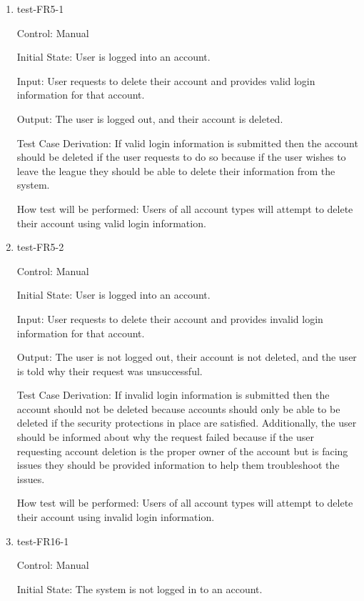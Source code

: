 \documentclass[12pt, titlepage]{article}
\begin{document}
\begin{enumerate}
  \item{test-FR5-1\\}

  Control: Manual
           
  Initial State: User is logged into an account.
           
  Input: User requests to delete their account and provides valid login
  information for that account.
           
  Output: The user is logged out, and their account is deleted.
 
  Test Case Derivation: If valid login information is submitted then the
  account should be deleted if the user requests to do so because if the user
  wishes to leave the league they should be able to delete their information
  from the system.
 
  How test will be performed: Users of all account types will attempt to delete
  their account using valid login information.

  \item{test-FR5-2\\}

  Control: Manual
           
  Initial State: User is logged into an account.
           
  Input: User requests to delete their account and provides invalid login
  information for that account.
           
  Output: The user is not logged out, their account is not deleted, and
  the user is told why their request was unsuccessful.
 
  Test Case Derivation: If invalid login information is submitted then the
  account should not be deleted because accounts should only be able to be
  deleted if the security protections in place are satisfied. Additionally,
  the user should be informed about why the request failed because if the
  user requesting account deletion is the proper owner of the account but is
  facing issues they should be provided information to help them troubleshoot
  the issues.
 
  How test will be performed: Users of all account types will attempt to delete
  their account using invalid login information.

  \item{test-FR16-1\\}

  Control: Manual
            
  Initial State: The system is not logged in to an account.
            

\end{enumerate}
\end{document}
